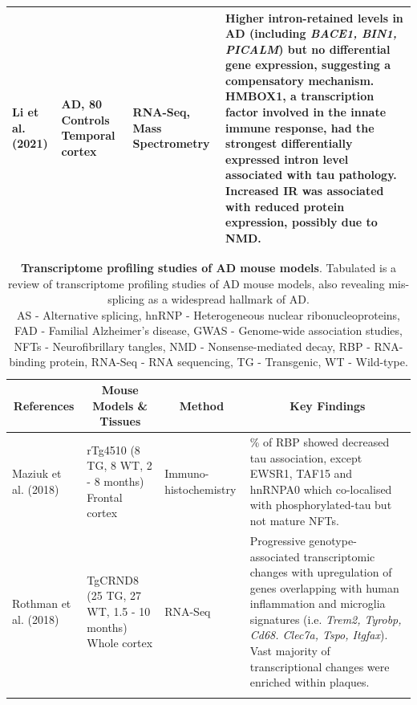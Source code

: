 \begin{landscape}
\begin{longtable}[c]{p{3cm}p{4cm}p{3cm}p{16cm}}
		\centering Li et al. (2021) \cite{Li2021} &
		\centering 84 AD, 80 Controls \newline Temporal cortex &
		\centering RNA-Seq, Mass Spectrometry &
		\tabitem Higher intron-retained levels in AD (including \textit{BACE1, BIN1, PICALM}) but no differential gene expression, suggesting a compensatory mechanism. \newline
		\tabitem HMBOX1, a transcription factor involved in the innate immune response, had the strongest differentially expressed intron level associated with tau pathology. \newline
		\tabitem Increased IR was associated with reduced protein expression, possibly due to NMD. \\* \bottomrule
	\end{longtable}

	\clearpage
	\begin{longtable}[c]{p{3cm}p{4cm}p{3cm}p{16cm}}
		\caption[Transcriptome profiling studies of AD mouse models]%
		{\textbf{Transcriptome profiling studies of AD mouse models}. Tabulated is a review of transcriptome profiling studies of AD mouse models, also revealing mis-splicing as a widespread hallmark of AD. \newline AS - Alternative splicing, hnRNP - Heterogeneous nuclear ribonucleoproteins, FAD - Familial Alzheimer's disease, GWAS - Genome-wide association studies, NFTs - Neurofibrillary tangles, NMD - Nonsense-mediated decay, RBP - RNA-binding protein, RNA-Seq - RNA sequencing, TG - Transgenic, WT - Wild-type.}
		\label{tab: AS_ADMouse_studies}\\
		\toprule
		\multicolumn{1}{c}{References} &
		\multicolumn{1}{c}{Mouse Models \& Tissues} &
		\multicolumn{1}{c}{Method} &
		\multicolumn{1}{c}{Key Findings} \\* \midrule
		\endfirsthead			\endhead			\bottomrule			\endfoot			\endlastfoot	
		
		\centering Maziuk et al. (2018)\cite{Maziuk2018} &
		\centering rTg4510 (8 TG, 8 WT, 2 - 8 months) Frontal cortex&
		\centering Immuno-\newline histochemistry &
		\tabitem 65\% of RBP showed decreased tau association, except EWSR1, TAF15 and hnRNPA0 which co-localised with phosphorylated-tau but not mature NFTs. \\
		\hdashline[0.5pt/5pt]
		
		\centering Rothman et al. (2018)\cite{Rothman2018}&
		\centering TgCRND8 (25 TG, 27 WT, 1.5 - 10 months) \newline Whole cortex&
		\centering RNA-Seq &
		\tabitem Progressive genotype-associated transcriptomic changes with upregulation of genes overlapping with human inflammation and microglia signatures (i.e. \textit{Trem2, Tyrobp, Cd68. Clec7a, Tspo, Itgfax}). \newline
		\tabitem Vast majority of transcriptional changes were enriched within plaques.  \\
		\hdashline[0.5pt/5pt]
		

\end{longtable}
\end{landscape}
